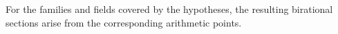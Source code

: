 \begin{corollary}
\label{birational-section-conjecture-strong-birationality-secondary}
For the families and fields covered by the hypotheses, the resulting birational sections arise from the corresponding arithmetic points.
\notready
\end{corollary}
